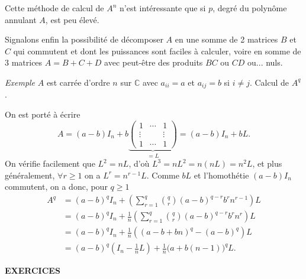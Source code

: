 
Cette méthode de calcul de $A^n$ n'est intéressante que si $p$, degré du polynôme annulant $A$, est peu élevé.

Signalons enfin la possibilité de décomposer $A$ en une somme de 2 matrices $B$ et $C$ qui commutent et dont les puissances sont faciles à calculer, voire en somme de 3 matrices $A=B+C+D$ avec peut-être des produits $BC$ ou $CD$ ou... nuls.

\medskip\noindent\emph{Exemple} $A$ est carrée d'ordre $n$ sur $\mathbb C$ avec $a_{ii}=a$ et $a_{ij}=b$ si $i\ne j$. Calcul de $A^q$.

On est porté à écrire
\[
A=(a-b)I_n+b
\underbrace{\begin{pmatrix}
1&\cdots&1\\
\vdots&&\vdots\\
1&\cdots&1
\end{pmatrix}}_{=L}
=(a-b)I_n+bL.
\]
On vérifie facilement que $L^2=nL$, d'où $L^3=nL^2=n(nL)=n^2L$, et plus généralement, $\forall r\ge1$ on a $L^r=n^{r-1}L$. Comme $bL$ et l'homothétie $(a-b)I_n$ commutent, on a donc, pour $q\ge1$
\[
\begin{aligned}
A^q&=(a-b)^qI_n+\left(\sum_{r=1}^q\binom qr(a-b)^{q-r}b^rn^{r-1}\right)L\\
&=(a-b)^qI_n+\frac1n\left(\sum_{r=1}^q\binom qr(a-b)^{q-r}b^rn^r\right)L\\
&=(a-b)^qI_n+\frac1n\left((a-b+bn)^q-(a-b)^q\right)L\\
&=(a-b)^q\left(I_n-\frac1nL\right)+\frac1n\bigl(a+b(n-1)\bigr)^qL.
\end{aligned}
\]

\begin{center}
{\Large\sffamily\bfseries\color{BellaLavenderDeep} EXERCICES}
\end{center}
\vspace{0.8em}

